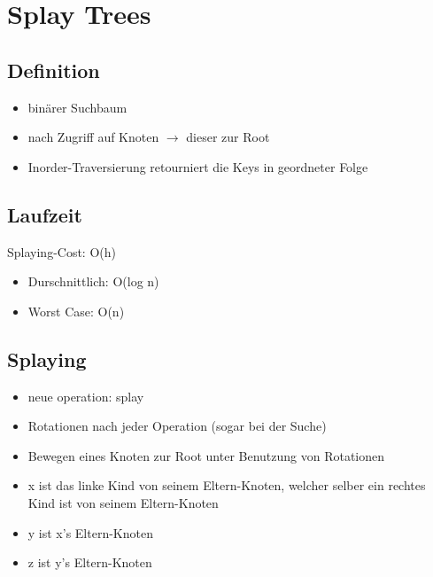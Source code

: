 \section{Splay Trees}
\subsection{Definition}
\begin{itemize}
    \item binärer Suchbaum
    \item nach Zugriff auf Knoten $\rightarrow$ dieser zur Root
    \item Inorder-Traversierung retourniert die Keys in geordneter Folge
\end{itemize}

\subsection{Laufzeit}
Splaying-Cost: O(h)
\begin{itemize}
    \item Durschnittlich: O(log n)
    \item Worst Case: O(n)
\end{itemize}

\subsection{Splaying}
\begin{itemize}
    \item neue operation: splay
    \item Rotationen nach jeder Operation (sogar bei der Suche)
    \item Bewegen eines Knoten zur Root unter Benutzung von Rotationen
\end{itemize}

\begin{itemize}
    \item x ist das linke Kind von seinem Eltern-Knoten, welcher selber ein rechtes Kind ist von seinem Eltern-Knoten
    \item y ist x’s Eltern-Knoten
    \item z ist y’s Eltern-Knoten
\end{itemize}

